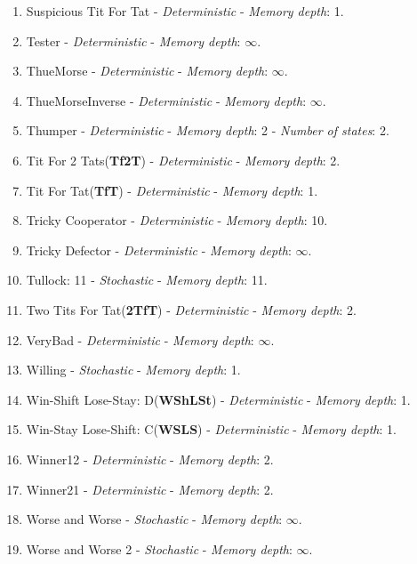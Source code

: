 \documentclass[10pt,letterpaper]{article}
\begin{document}
\begin{enumerate}
\item Suspicious Tit For Tat - \textit{Deterministic} - \textit{Memory depth}: 1. \cite{Beaufils1997, Hilbe2013}
\item Tester - \textit{Deterministic} - \textit{Memory depth}: \(\infty\). \cite{Axelrod1980b}
\item ThueMorse - \textit{Deterministic} - \textit{Memory depth}: \(\infty\). \cite{axelrodproject}
\item ThueMorseInverse - \textit{Deterministic} - \textit{Memory depth}: \(\infty\). \cite{axelrodproject}
\item Thumper - \textit{Deterministic} - \textit{Memory depth}: 2 - \textit{Number of states}: 2. \cite{Ashlock2008}
\item Tit For 2 Tats(\textbf{Tf2T}) - \textit{Deterministic} - \textit{Memory depth}: 2. \cite{Axelrod1984}
\item Tit For Tat(\textbf{TfT}) - \textit{Deterministic} - \textit{Memory depth}: 1. \cite{Axelrod1980a}
\item Tricky Cooperator - \textit{Deterministic} - \textit{Memory depth}: 10. \cite{axelrodproject}
\item Tricky Defector - \textit{Deterministic} - \textit{Memory depth}: \(\infty\). \cite{axelrodproject}
\item Tullock: 11 - \textit{Stochastic} - \textit{Memory depth}: 11. \cite{Axelrod1980a}
\item Two Tits For Tat(\textbf{2TfT}) - \textit{Deterministic} - \textit{Memory depth}: 2. \cite{Axelrod1984}
\item VeryBad - \textit{Deterministic} - \textit{Memory depth}: \(\infty\). \cite{Andre2013}
\item Willing - \textit{Stochastic} - \textit{Memory depth}: 1. \cite{Berg2015}
\item Win-Shift Lose-Stay: D(\textbf{WShLSt}) - \textit{Deterministic} - \textit{Memory depth}: 1. \cite{Li2011}
\item Win-Stay Lose-Shift: C(\textbf{WSLS}) - \textit{Deterministic} - \textit{Memory depth}: 1. \cite{Kraines1989, Nowak1993, Stewart2012}
\item Winner12 - \textit{Deterministic} - \textit{Memory depth}: 2. \cite{Mathieu2015}
\item Winner21 - \textit{Deterministic} - \textit{Memory depth}: 2. \cite{Mathieu2015}
\item Worse and Worse - \textit{Stochastic} - \textit{Memory depth}: \(\infty\). \cite{Prison1998}
\item Worse and Worse 2 - \textit{Stochastic} - \textit{Memory depth}: \(\infty\). \cite{Prison1998}

\end{enumerate}
\end{document}
